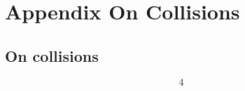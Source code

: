 \chapter{Appendix On Collisions}
\label{ch: appendix-collisions}

\section{On collisions}

\begin{equation}
4
\end{equation}


